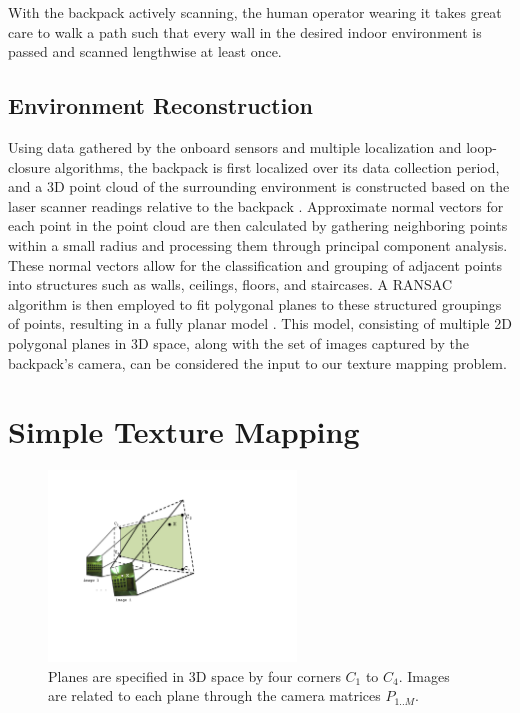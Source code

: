 \documentclass[10pt,twocolumn,letterpaper]{article}
\begin{document}
With the backpack actively scanning, the human operator wearing it
takes great care to walk a path such that every wall in the desired
indoor environment is passed and scanned lengthwise at least once.

\subsection{Environment Reconstruction}
Using data gathered by the onboard sensors and multiple localization
and loop-closure algorithms, the backpack is first localized over its
data collection period, and a 3D point cloud of the surrounding
environment is constructed based on the laser scanner readings
relative to the backpack \cite{chen2010indoor}. Approximate normal vectors for
each point in the point cloud are then calculated by gathering
neighboring points within a small radius and processing them through
principal component analysis. These normal vectors allow for the
classification and grouping of adjacent points into structures such as
walls, ceilings, floors, and staircases. A RANSAC algorithm is then
employed to fit polygonal planes to these structured groupings of
points, resulting in a fully planar model \cite{sanchez2012point}. This model,
consisting of multiple 2D polygonal planes in 3D space, along with the
set of images captured by the backpack's camera, can be considered the
input to our texture mapping problem.


\section{Simple Texture Mapping}

\begin{figure}
  \centering
  \includegraphics[height=2in]{Projection.pdf}
  \caption{Planes are specified in 3D space by four corners $C_1$ to
    $C_4$. Images are related to each plane through the camera
    matrices $P_{1..M}$. }
  \label{fig:projection}
\end{figure}
\end{document}
